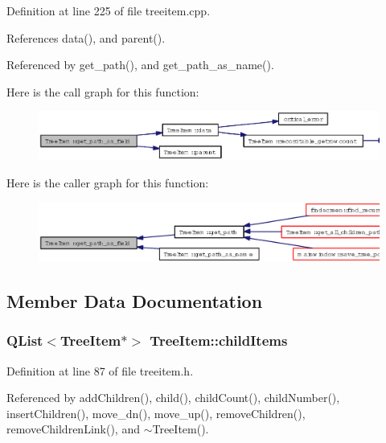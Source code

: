 Definition at line 225 of file treeitem.cpp.

References data(), and parent().

Referenced by get\_\-path(), and get\_\-path\_\-as\_\-name().

Here is the call graph for this function:\begin{figure}[H]
\begin{center}
\leavevmode
\includegraphics[width=366pt]{classTreeItem_a55f28f0c0a558f914759a6c8ebb28b9_cgraph}
\end{center}
\end{figure}


Here is the caller graph for this function:\begin{figure}[H]
\begin{center}
\leavevmode
\includegraphics[width=329pt]{classTreeItem_a55f28f0c0a558f914759a6c8ebb28b9_icgraph}
\end{center}
\end{figure}


\subsection{Member Data Documentation}
\subsubsection{\setlength{\rightskip}{0pt plus 5cm}QList$<${\bf Tree\-Item}$\ast$$>$ {\bf Tree\-Item::child\-Items}\hspace{0.3cm}{\tt  [private]}}\label{classTreeItem_7ea3d75732252074ae15587693b4fa01}




Definition at line 87 of file treeitem.h.

Referenced by add\-Children(), child(), child\-Count(), child\-Number(), insert\-Children(), move\_\-dn(), move\_\-up(), remove\-Children(), remove\-Children\-Link(), and $\sim$Tree\-Item().

